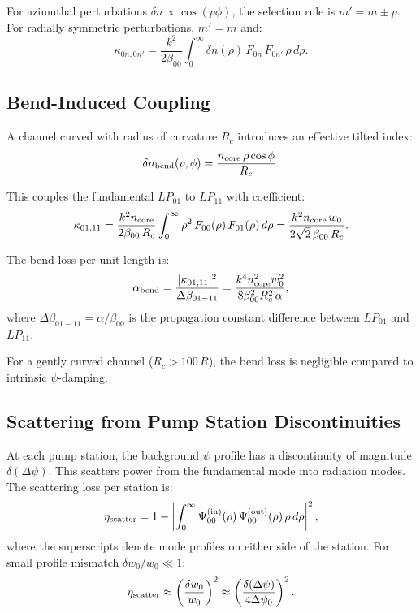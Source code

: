 \documentclass[twocolumn,superscriptaddress,prd]{revtex4-2}
\begin{document}
For azimuthal perturbations $\delta n \propto \cos(p\phi)$, the
selection rule is $m' = m \pm p$.  For radially symmetric perturbations,
$m' = m$ and:
\begin{equation}
\kappa_{0n,0n'} = \frac{k^2}{2\beta_{00}}\int_0^\infty \delta n(\rho)\,F_{0n}\,F_{0n'}\,\rho\,d\rho.
\end{equation}

\subsection{Bend-Induced Coupling}

A channel curved with radius of curvature $R_c$ introduces
an effective tilted index:
\begin{equation}
\delta n_{\rm bend}(\rho,\phi) = \frac{n_{\rm core}\,\rho\cos\phi}{R_c}.
\end{equation}

This couples the fundamental $LP_{01}$ to $LP_{11}$ with coefficient:
\begin{equation}
\kappa_{01,11} = \frac{k^2 n_{\rm core}}{2\beta_{00}\,R_c}
\int_0^\infty \rho^2\,F_{00}(\rho)\,F_{01}(\rho)\,d\rho
= \frac{k^2 n_{\rm core}\,w_0}{2\sqrt{2}\,\beta_{00}\,R_c}.
\label{eq:bend-coupling}
\end{equation}

The bend loss per unit length is:
\begin{equation}
\alpha_{\rm bend} = \frac{|\kappa_{01,11}|^2}{\Delta\beta_{01-11}} = \frac{k^4 n_{\rm core}^2 w_0^2}{8\beta_{00}^2 R_c^2\,\alpha},
\label{eq:bend-loss}
\end{equation}
where $\Delta\beta_{01-11} = \alpha/\beta_{00}$ is the propagation
constant difference between $LP_{01}$ and $LP_{11}$.

For a gently curved channel ($R_c > 100\,R$), the bend loss
is negligible compared to intrinsic $\psi$-damping.

\subsection{Scattering from Pump Station Discontinuities}

At each pump station, the background $\psi$ profile has a
discontinuity of magnitude $\delta(\Delta\psi)$.  This scatters
power from the fundamental mode into radiation modes.  The
scattering loss per station is:
\begin{equation}
\eta_{\rm scatter} = 1 - \left|\int_0^\infty \Psi_{00}^{(\rm in)}(\rho)\,\Psi_{00}^{(\rm out)}(\rho)\,\rho\,d\rho\right|^2,
\end{equation}
where the superscripts denote mode profiles on either side
of the station.  For small profile mismatch $\delta w_0/w_0 \ll 1$:
\begin{equation}
\eta_{\rm scatter} \approx \left(\frac{\delta w_0}{w_0}\right)^2 \approx \left(\frac{\delta(\Delta\psi)}{4\Delta\psi_0}\right)^2.
\label{eq:scatter-loss}
\end{equation}
\end{document}
